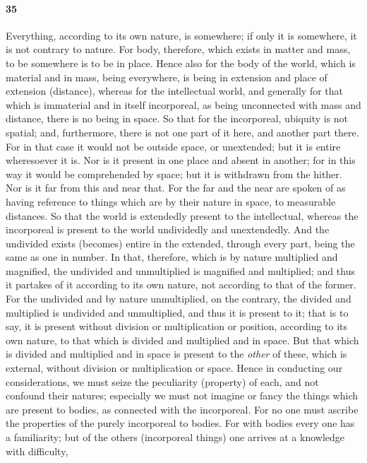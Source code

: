 \documentclass[12pt]{article}
\begin{document}
\paragraph{35} Everything, according to its own nature, is somewhere; if only
it is somewhere, it is not contrary to nature. For body, therefore, which
exists in matter and mass, to be somewhere is to be in place. Hence also for
the body of the world, which is material and in mass, being everywhere, is
being in extension and place of extension (distance), whereas for the
intellectual world, and generally for that which is immaterial and in itself
incorporeal, as being unconnected with mass and distance, there is no being in
space. So that for the incorporeal, ubiquity is not spatial; and, furthermore,
there is not one part of it here, and another part there. For in that case it
would not be outside space, or unextended; but it is entire wheresoever it is.
Nor is it present in one place and absent in another; for in this way it would
be comprehended by space; but it is withdrawn from the hither. Nor is it far
from this and near that. For the far and the near are spoken of as having
reference to things which are by their nature in space, to measurable
distances. So that the world is extendedly present to the intellectual, whereas
the incorporeal is present to the world undividedly and unextendedly. And the
undivided exists (becomes) entire in the extended, through every part, being
the same as one in number. In that, therefore, which is by nature multiplied
and magnified, the undivided and unmultiplied is magnified and multiplied; and
thus it partakes of it according to its own nature, not according to that of
the former. For the undivided and by nature unmultiplied, on the contrary, the
divided and multiplied is undivided and unmultiplied, and thus it is present to
it; that is to say, it is present without division or multiplication or
position, according to its own nature, to that which is divided and multiplied
and in space. But that which is divided and multiplied and in space is present
to the \textit{other} of these, which is external, without division or
multiplication or space. Hence in conducting our considerations, we must seize
the peculiarity (property) of each, and not confound their natures; especially
we must not imagine or fancy the things which are present to bodies, as
connected with the incorporeal. For no one must ascribe the properties of the
purely incorporeal to bodies. For with bodies every one has a familiarity; but
of the others (incorporeal things) one arrives at a knowledge with difficulty,
\end{document}
